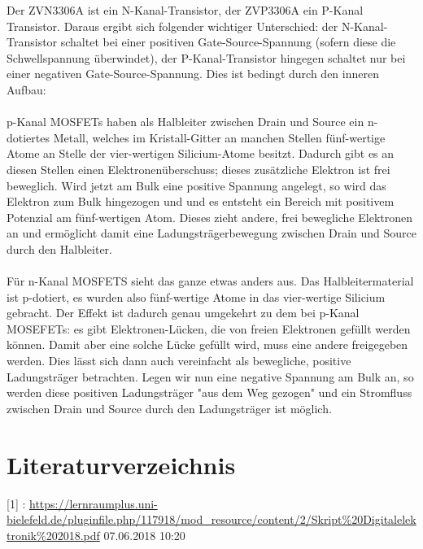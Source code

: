 \documentclass[11pt, a4paper]{article}
\begin{document}
\label{auswertung}
Der ZVN3306A ist ein N-Kanal-Transistor, der ZVP3306A ein P-Kanal Transistor. Daraus ergibt sich folgender wichtiger Unterschied: der N-Kanal-Transistor schaltet bei einer positiven Gate-Source-Spannung (sofern diese die Schwellspannung überwindet), der P-Kanal-Transistor hingegen schaltet nur bei einer negativen Gate-Source-Spannung. Dies ist bedingt durch den inneren Aufbau:
\\
\\
p-Kanal MOSFETs haben als Halbleiter zwischen Drain und Source ein n-dotiertes Metall, welches im Kristall-Gitter an manchen Stellen fünf-wertige Atome an Stelle der vier-wertigen Silicium-Atome besitzt. Dadurch gibt es an diesen Stellen einen Elektronenüberschuss; dieses zusätzliche Elektron ist frei beweglich. Wird jetzt am Bulk eine positive Spannung angelegt, so wird das Elektron zum Bulk hingezogen und und es entsteht ein Bereich mit positivem Potenzial am fünf-wertigen Atom. Dieses zieht andere, frei bewegliche Elektronen an und ermöglicht damit eine Ladungsträgerbewegung zwischen Drain und Source durch den Halbleiter.
\\
\\
Für n-Kanal MOSFETS sieht das ganze etwas anders aus. Das Halbleitermaterial ist p-dotiert, es wurden also fünf-wertige Atome in das vier-wertige Silicium gebracht. Der Effekt ist dadurch genau umgekehrt zu dem bei p-Kanal MOSEFETs: es gibt Elektronen-Lücken, die von freien Elektronen gefüllt werden können. Damit aber eine solche Lücke gefüllt wird, muss eine andere freigegeben werden. Dies lässt sich dann auch vereinfacht als bewegliche, positive Ladungsträger betrachten. Legen wir nun eine negative Spannung am Bulk an, so werden diese positiven Ladungsträger "aus dem Weg gezogen" und ein Stromfluss zwischen Drain und Source durch den Ladungsträger ist möglich.

\section*{Literaturverzeichnis}

[1] :
\url{https://lernraumplus.uni-bielefeld.de/pluginfile.php/117918/mod_resource/content/2/Skript%20Digitalelektronik%202018.pdf}     07.06.2018 10:20
\end{document}
